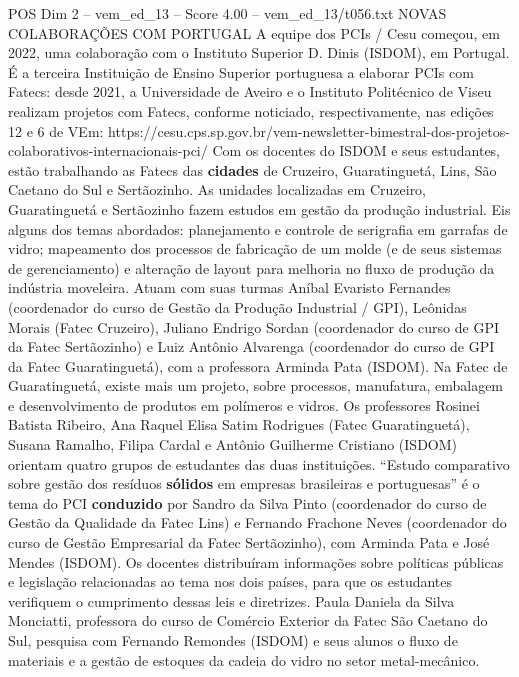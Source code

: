 \begin{textsample}{POS Dim 2 – vem\_ed\_13 – Score 4.00 – vem\_ed\_13/t056.txt}  \label{ex:f2_pos_074}
NOVAS COLABORAÇÕES COM PORTUGAL A equipe dos PCIs / Cesu começou, em 2022, uma colaboração com o Instituto Superior D.
Dinis (ISDOM), em Portugal.
É a terceira Instituição de Ensino Superior portuguesa a elaborar PCIs com Fatecs: desde 2021, a Universidade de Aveiro e o Instituto Politécnico de Viseu realizam projetos com Fatecs, conforme noticiado, respectivamente, nas edições 12 e 6 de VEm: https://cesu.cps.sp.gov.br/vem-newsletter-bimestral-dos-projetos-colaborativos-internacionais-pci/ Com os docentes do ISDOM e seus estudantes, estão trabalhando as Fatecs das \textbf{cidades} de Cruzeiro, Guaratinguetá, Lins, São Caetano do Sul e Sertãozinho.
As unidades localizadas em Cruzeiro, Guaratinguetá e Sertãozinho fazem estudos em gestão da produção industrial.
Eis alguns dos temas abordados: planejamento e controle de serigrafia em garrafas de vidro; mapeamento dos processos de fabricação de um molde (e de seus sistemas de gerenciamento) e alteração de layout para melhoria no fluxo de produção da indústria moveleira.
Atuam com suas turmas Aníbal Evaristo Fernandes (coordenador do curso de Gestão da Produção Industrial / GPI), Leônidas Morais (Fatec Cruzeiro), Juliano Endrigo Sordan (coordenador do curso de GPI da Fatec Sertãozinho) e Luiz Antônio Alvarenga (coordenador do curso de GPI da Fatec Guaratinguetá), com a professora Arminda Pata (ISDOM).
Na Fatec de Guaratinguetá, existe mais um projeto, sobre processos, manufatura, embalagem e desenvolvimento de produtos em polímeros e vidros.
Os professores Rosinei Batista Ribeiro, Ana Raquel Elisa Satim Rodrigues (Fatec Guaratinguetá), Susana Ramalho, Filipa Cardal e Antônio Guilherme Cristiano (ISDOM) orientam quatro grupos de estudantes das duas instituições. “Estudo comparativo sobre gestão dos resíduos \textbf{sólidos} em empresas brasileiras e portuguesas” é o tema do PCI \textbf{conduzido} por Sandro da Silva Pinto (coordenador do curso de Gestão da Qualidade da Fatec Lins) e Fernando Frachone Neves (coordenador do curso de Gestão Empresarial da Fatec Sertãozinho), com Arminda Pata e José Mendes (ISDOM).
Os docentes distribuíram informações sobre políticas públicas e legislação relacionadas ao tema nos dois países, para que os estudantes verifiquem o cumprimento dessas leis e diretrizes.
Paula Daniela da Silva Monciatti, professora do curso de Comércio Exterior da Fatec São Caetano do Sul, pesquisa com Fernando Remondes (ISDOM) e seus alunos o fluxo de materiais e a gestão de estoques da cadeia do vidro no setor metal-mecânico.

\end{textsample}
